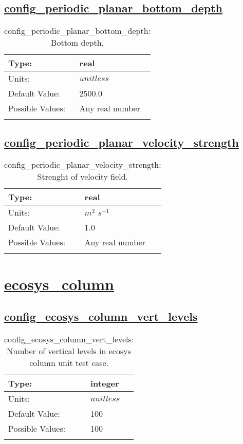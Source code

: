 \subsection[config\_periodic\_planar\_bottom\_depth]{\hyperref[sec:nm_tab_periodic_planar]{config\_periodic\_planar\_bottom\_depth}}
\label{subsec:nm_sec_config_periodic_planar_bottom_depth}
\begin{center}
\begin{longtable}{| p{2.0in} || p{4.0in} |}
    \hline
    Type: & real \\
    \hline
    Units: & $unitless$ \\
    \hline
    Default Value: & 2500.0 \\
    \hline
    Possible Values: & Any real number \\
    \hline
    \caption{config\_periodic\_planar\_bottom\_depth: Bottom depth.}
\end{longtable}
\end{center}
\subsection[config\_periodic\_planar\_velocity\_strength]{\hyperref[sec:nm_tab_periodic_planar]{config\_periodic\_planar\_velocity\_strength}}
\label{subsec:nm_sec_config_periodic_planar_velocity_strength}
\begin{center}
\begin{longtable}{| p{2.0in} || p{4.0in} |}
    \hline
    Type: & real \\
    \hline
    Units: & $m^2$ $s^{-1}$ \\
    \hline
    Default Value: & 1.0 \\
    \hline
    Possible Values: & Any real number \\
    \hline
    \caption{config\_periodic\_planar\_velocity\_strength: Strenght of velocity field.}
\end{longtable}
\end{center}
\section[ecosys\_column]{\hyperref[sec:nm_tab_ecosys_column]{ecosys\_column}}
\label{sec:nm_sec_ecosys_column}
\subsection[config\_ecosys\_column\_vert\_levels]{\hyperref[sec:nm_tab_ecosys_column]{config\_ecosys\_column\_vert\_levels}}
\label{subsec:nm_sec_config_ecosys_column_vert_levels}
\begin{center}
\begin{longtable}{| p{2.0in} || p{4.0in} |}
    \hline
    Type: & integer \\
    \hline
    Units: & $unitless$ \\
    \hline
    Default Value: & 100 \\
    \hline
    Possible Values: & 100 \\
    \hline
    \caption{config\_ecosys\_column\_vert\_levels: Number of vertical levels in ecosys column unit test case.}
\end{longtable}
\end{center}
